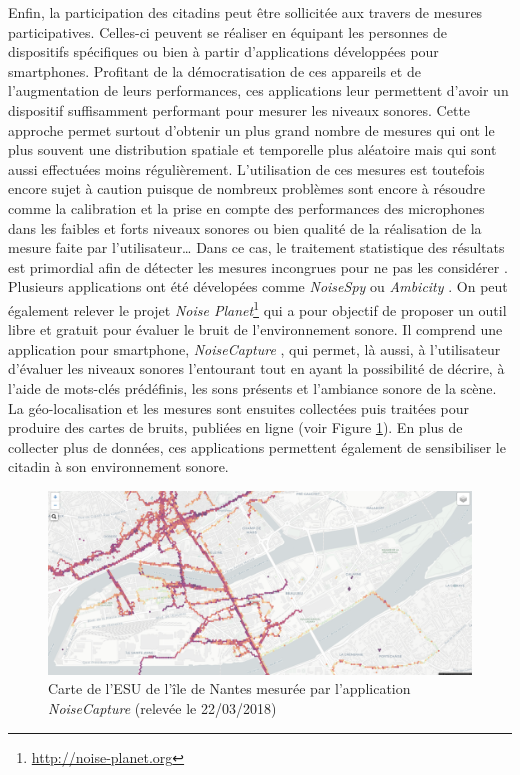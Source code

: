Enfin, la participation des citadins peut être sollicitée aux travers de mesures participatives. Celles-ci peuvent se réaliser en équipant les personnes de dispositifs spécifiques \cite{aumond2017study} ou bien à partir d'applications développées pour smartphones. Profitant de la démocratisation de ces appareils et de l'augmentation de leurs performances, ces applications leur permettent d'avoir un dispositif suffisamment performant pour mesurer les niveaux sonores. Cette approche permet surtout d'obtenir un plus grand nombre de mesures qui ont le plus souvent une distribution spatiale et temporelle plus aléatoire mais qui sont aussi effectuées moins régulièrement. L'utilisation de ces mesures est toutefois encore sujet à caution puisque de nombreux problèmes sont encore à résoudre comme la calibration et la prise en compte des performances des microphones dans les faibles et forts niveaux sonores ou bien qualité de la réalisation de la mesure faite par l'utilisateur\dots{} Dans ce cas, le traitement statistique des résultats est primordial afin de détecter les mesures incongrues pour ne pas les considérer \cite{guillaume2016noise}. Plusieurs applications ont été dévelopées comme \textit{NoiseSpy} \cite{kanjo_noisespy_2010} ou \textit{Ambicity} \cite{ventura2017estimation}. On peut également relever le projet \textit{Noise Planet}\footnote{\url{http://noise-planet.org}} qui a pour objectif de proposer un outil libre et gratuit pour évaluer le bruit de l'environnement sonore. Il comprend une application pour smartphone, \textit{NoiseCapture} \cite{guillaume2016noise}, qui permet, là aussi, à l'utilisateur d'évaluer les niveaux sonores l'entourant tout en ayant la possibilité de décrire, à l'aide de mots-clés prédéfinis, les sons présents et l'ambiance sonore de la scène. La géo-localisation et les mesures sont ensuites collectées puis traitées pour produire des cartes de bruits, publiées en ligne (voir Figure \ref{fig:carte_noiseModelling}). En plus de collecter plus de données, ces applications permettent également de sensibiliser le citadin à son environnement sonore.\\ 

\begin{figure}[t]
\centering
\includegraphics[width=0.7\linewidth]{./figures/cartographie/noise_modelling.PNG}
\caption{Carte de l'ESU de l'île de Nantes mesurée par l'application \textit{NoiseCapture}  (relevée le 22/03/2018)}
\label{fig:carte_noiseModelling}
\end{figure}


